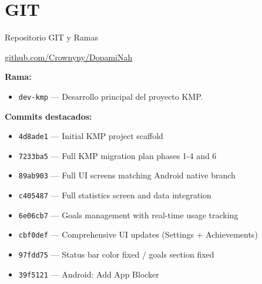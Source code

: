 \documentclass[aspectratio=169]{beamer}
\begin{document}
\section{GIT}
\begin{frame}{Repositorio GIT y Ramas}
  \begin{center}
\href{https://github.com/Crownyny/DopamiNah}{github.com/Crownyny/DopamiNah}
  \end{center}
  \vspace{-0.3cm}

  \vspace{0.3cm}
  \textbf{Rama:}
  \begin{itemize}
    \item \texttt{dev-kmp} — Desarrollo principal del proyecto KMP.
  \end{itemize}

  \vspace{0.3cm}
  \textbf{Commits destacados:}
  \begin{itemize}
    \small
    \item \texttt{4d8ade1} — Initial KMP project scaffold
    \item \texttt{7233ba5} — Full KMP migration plan phases 1-4 and 6
    \item \texttt{89ab903} — Full UI screens matching Android native branch
    \item \texttt{c405487} — Full statistics screen and data integration
    \item \texttt{6e06cb7} — Goals management with real-time usage tracking
    \item \texttt{cbf0def} — Comprehensive UI updates (Settings + Achievements)
    \item \texttt{97fdd75} — Status bar color fixed / goals section fixed
    \item \texttt{39f5121} — Android: Add App Blocker
  \end{itemize}
\end{frame}

\end{document}

